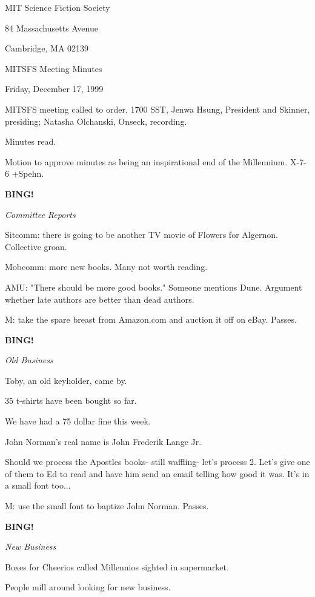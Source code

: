 \documentclass[12pt]{article}
\newcommand{\bing}{{\bf BING!} }
\newcommand{\goto}[1]{\bing \vskip 12pt \centerline{{\em{#1}}}}
\begin{document}
\begin{center}

MIT Science Fiction Society 

84 Massachusetts Avenue

Cambridge, MA 02139

\vspace{12pt}

MITSFS Meeting Minutes 

Friday, December 17, 1999

\end{center}
 
\vspace{18pt}

\setlength{\parskip}{6pt}

\noindent
MITSFS meeting called to order, 1700 SST,
Jenwa Hsung, President and Skinner, presiding; Natasha Olchanski, Onseck, recording.

Minutes read.

Motion to approve minutes as being an inspirational end of the Millennium. X-7-6 +Spehn.

\goto{Committee Reports}

Sitcomm: there is going to be another TV movie of Flowers for Algernon. Collective groan.

Mobcomm: more new books. Many not worth reading.

AMU: "There should be more good books." Someone mentions Dune. Argument whether late authors are better than dead authors.

M: take the spare breast from Amazon.com and auction it off on eBay. Passes.

\goto{Old Business}

Toby, an old keyholder, came by.

35 t-shirts have been bought so far.

We have had a 75 dollar fine this week.

John Norman's real name is John Frederik Lange Jr.

Should we process the Apostles books- still waffling- let's process 2. Let's give one of them to Ed to read and have him send an email telling how good it was. It's in a small font too...

M: use the small font to baptize John Norman. Passes.

\goto{New Business}

Boxes for Cheerios called Millennios sighted in supermarket.

People mill around looking for new business.
\end{document}
